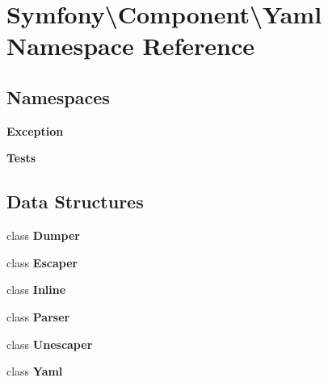 \section{Symfony\textbackslash{}Component\textbackslash{}Yaml Namespace Reference}
\label{namespace_symfony_1_1_component_1_1_yaml}
\subsection*{Namespaces}
\begin{DoxyCompactItemize}
\item 
 {\bf Exception}
\item 
 {\bf Tests}
\end{DoxyCompactItemize}
\subsection*{Data Structures}
\begin{DoxyCompactItemize}
\item 
class {\bf Dumper}
\item 
class {\bf Escaper}
\item 
class {\bf Inline}
\item 
class {\bf Parser}
\item 
class {\bf Unescaper}
\item 
class {\bf Yaml}
\end{DoxyCompactItemize}
